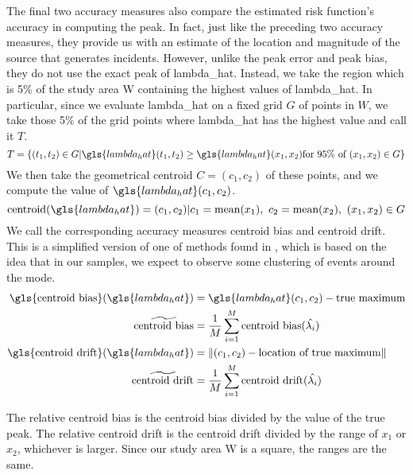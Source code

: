 The final two accuracy measures also compare the estimated risk function's accuracy in computing the peak.
In fact,
just like the preceding two accuracy measures,
they provide us with an estimate of the location and magnitude of the source that generates incidents.
However, unlike the \gls{peak error} and \gls{peak bias},
they do not use the exact peak of \gls{lambda_hat}.
Instead,
we take the region which is 5\% of the study area \gls{W} containing the highest values of \gls{lambda_hat}.
In particular,
since we evaluate \gls{lambda_hat} on a fixed grid $G$ of points in $W$,
we take those 5\% of the grid points where \gls{lambda_hat} has the highest value and call it $T$.
\begin{equation}
    T = \left\{ (t_1, t_2) \in G | \gls{lambda_hat}(t_1, t_2)%
        \geq \gls{lambda_hat}\xvec \text{for 95\% of}~\xvec \in G \right\}%
\end{equation}
We then take the geometrical centroid $C=(c_1,c_2)$ of these points,
and we compute the value of $\gls{lambda_hat}(c_1,c_2)$.
\begin{equation}
    \mbox{centroid}(\gls{lambda_hat}) 
        = (c_1, c_2) | c_1 = \mbox{mean}(x_1),~c_2 = \mbox{mean}(x_2),~(x_1, x_2) \in G%
\end{equation}
We call the corresponding accuracy measures \gls{centroid bias} and \gls{centroid drift}.
This is a simplified version of one of methods found in \citet{dalenius1965mode},
which is based on the idea that in our samples,
we expect to observe some clustering of events around the mode.
\begin{align}
    \mbox{\gls{centroid bias}}(\gls{lambda_hat})%
        & = \gls{lambda_hat}(c_1, c_2) - \mbox{true maximum} \\%
    \widetilde{\mbox{centroid bias}}%
        & = \frac{1}{M} \sum_{i=1}^{M} \mbox{centroid bias}(\hat{\lambda_i}) \\%
    \mbox{\gls{centroid drift}}(\gls{lambda_hat})%
        & = \norm{(c_1, c_2) - \mbox{location of true maximum}} \\%
    \widetilde{\mbox{centroid drift}}%
        & = \frac{1}{M} \sum_{i=1}^{M} \mbox{centroid drift}(\hat{\lambda_i})%
\end{align}

The \gls{relative centroid bias} is the \gls{centroid bias} divided by the value of the true peak.
The \gls{relative centroid drift} is the \gls{centroid drift} divided by the range of $x_1$ or $x_2$,
whichever is larger.
Since our study area \gls{W} is a square,
the ranges are the same.


